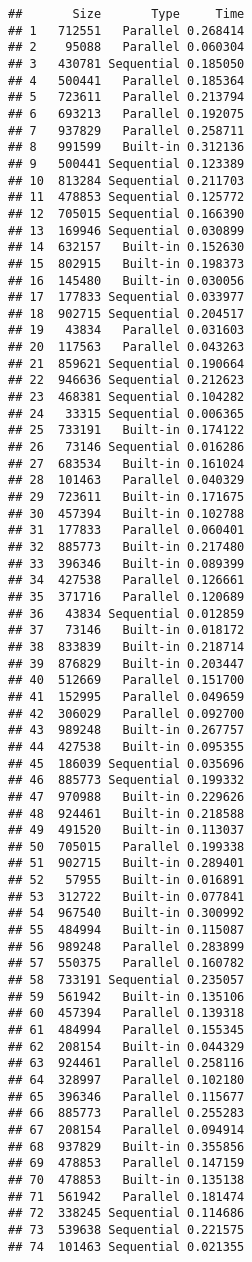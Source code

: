 \documentclass[
]{article}
\begin{document}
\begin{verbatim}
##       Size       Type     Time
## 1   712551   Parallel 0.268414
## 2    95088   Parallel 0.060304
## 3   430781 Sequential 0.185050
## 4   500441   Parallel 0.185364
## 5   723611   Parallel 0.213794
## 6   693213   Parallel 0.192075
## 7   937829   Parallel 0.258711
## 8   991599   Built-in 0.312136
## 9   500441 Sequential 0.123389
## 10  813284 Sequential 0.211703
## 11  478853 Sequential 0.125772
## 12  705015 Sequential 0.166390
## 13  169946 Sequential 0.030899
## 14  632157   Built-in 0.152630
## 15  802915   Built-in 0.198373
## 16  145480   Built-in 0.030056
## 17  177833 Sequential 0.033977
## 18  902715 Sequential 0.204517
## 19   43834   Parallel 0.031603
## 20  117563   Parallel 0.043263
## 21  859621 Sequential 0.190664
## 22  946636 Sequential 0.212623
## 23  468381 Sequential 0.104282
## 24   33315 Sequential 0.006365
## 25  733191   Built-in 0.174122
## 26   73146 Sequential 0.016286
## 27  683534   Built-in 0.161024
## 28  101463   Parallel 0.040329
## 29  723611   Built-in 0.171675
## 30  457394   Built-in 0.102788
## 31  177833   Parallel 0.060401
## 32  885773   Built-in 0.217480
## 33  396346   Built-in 0.089399
## 34  427538   Parallel 0.126661
## 35  371716   Parallel 0.120689
## 36   43834 Sequential 0.012859
## 37   73146   Built-in 0.018172
## 38  833839   Built-in 0.218714
## 39  876829   Built-in 0.203447
## 40  512669   Parallel 0.151700
## 41  152995   Parallel 0.049659
## 42  306029   Parallel 0.092700
## 43  989248   Built-in 0.267757
## 44  427538   Built-in 0.095355
## 45  186039 Sequential 0.035696
## 46  885773 Sequential 0.199332
## 47  970988   Built-in 0.229626
## 48  924461   Built-in 0.218588
## 49  491520   Built-in 0.113037
## 50  705015   Parallel 0.199338
## 51  902715   Built-in 0.289401
## 52   57955   Built-in 0.016891
## 53  312722   Built-in 0.077841
## 54  967540   Built-in 0.300992
## 55  484994   Built-in 0.115087
## 56  989248   Parallel 0.283899
## 57  550375   Parallel 0.160782
## 58  733191 Sequential 0.235057
## 59  561942   Built-in 0.135106
## 60  457394   Parallel 0.139318
## 61  484994   Parallel 0.155345
## 62  208154   Built-in 0.044329
## 63  924461   Parallel 0.258116
## 64  328997   Parallel 0.102180
## 65  396346   Parallel 0.115677
## 66  885773   Parallel 0.255283
## 67  208154   Parallel 0.094914
## 68  937829   Built-in 0.355856
## 69  478853   Parallel 0.147159
## 70  478853   Built-in 0.135138
## 71  561942   Parallel 0.181474
## 72  338245 Sequential 0.114686
## 73  539638 Sequential 0.221575
## 74  101463 Sequential 0.021355

\end{verbatim}
\end{document}
